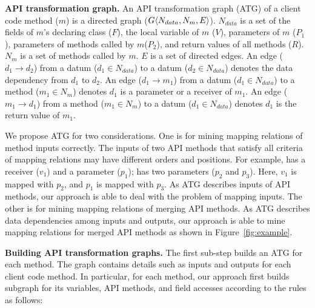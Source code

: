 \textbf{API transformation graph.} An API transformation graph (ATG)
of a client code method ($m$) is a directed graph
($G\langle N_{data}, N_{m}, E \rangle$). $N_{data}$ is a set of the fields
of $m$'s declaring class ($F$), the local variable of $m$ ($V$),
parameters of $m$ ($P_1$), parameters of methods called by
$m$($P_2$), and return values of all methods ($R$). $N_{m}$ is a set
of methods called by $m$. $E$ is a set of directed edges. An edge
($d_1\rightarrow d_2$) from a datum ($d_1 \in N_{data}$) to a datum
($d_2 \in N_{data}$) denotes the data dependency from $d_1$ to
$d_2$. An edge ($d_1 \rightarrow m_1$) from a datum ($d_1 \in
N_{data}$)  to a method ($ m_1 \in N_{m}$) denotes $d_1$ is a
parameter or a receiver of $m_1$. An edge ($m_1 \rightarrow d_1$)
from a method ($ m_1 \in N_{m}$) to a datum ($d_1 \in N_{data}$)
denotes $d_1$ is the return value of $m_1$.

We propose ATG for two considerations. One is for mining mapping
relations of method inputs correctly. The inputs of two API methods
that satisfy all criteria of mapping relations may have different
orders and positions. For example,  has a receiver ($v_1$) and a parameter
($p_1$);  has two
parameters ($p_2$ and $p_3$). Here, $v_1$ is mapped with $p_2$, and
$p_1$ is mapped with $p_3$. As ATG describes inputs of API methods,
our approach is able to deal with the problem of mapping inputs. The
other is for mining mapping relations of merging API methods. As ATG
describes data dependencies among inputs and outputs, our approach
is able to mine mapping relations for merged API methods as shown in
Figure~\ref{fig:example}.

\textbf{Building API transformation graphs.} The first sub-step
builds an ATG for each method. The graph contains details such as
inputs and outputs for each client code method. In particular, for
each method, our approach first builds subgraph for its variables,
API methods, and field accesses according to the rules as follows:


